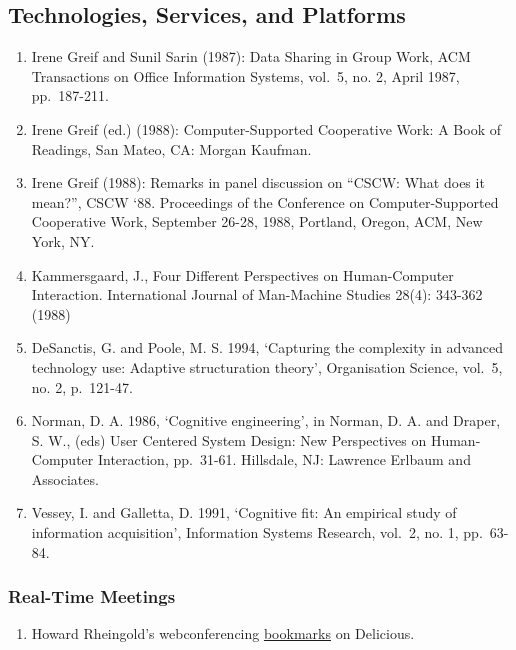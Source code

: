 \subsection{Technologies, Services, and
Platforms}\label{rec:technologies-services-and-platforms}

\begin{enumerate}
\def\labelenumi{\arabic{enumi}.}
\item
  Irene Greif and Sunil Sarin (1987): Data Sharing in Group Work, ACM
  Transactions on Office Information Systems, vol.~5, no. 2, April 1987,
  pp.~187-211.
\item
  Irene Greif (ed.) (1988): Computer-Supported Cooperative Work: A Book
  of Readings, San Mateo, CA: Morgan Kaufman.
\item
  Irene Greif (1988): Remarks in panel discussion on ``CSCW: What does
  it mean?'', CSCW `88. Proceedings of the Conference on
  Computer-Supported Cooperative Work, September 26-28, 1988, Portland,
  Oregon, ACM, New York, NY.
\item
  Kammersgaard, J., Four Different Perspectives on Human-Computer
  Interaction. International Journal of Man-Machine Studies 28(4):
  343-362 (1988)
\item
  DeSanctis, G. and Poole, M. S. 1994, `Capturing the complexity in
  advanced technology use: Adaptive structuration theory', Organisation
  Science, vol.~5, no. 2, p.~121-47.
\item
  Norman, D. A. 1986, `Cognitive engineering', in Norman, D. A. and
  Draper, S. W., (eds) User Centered System Design: New Perspectives on
  Human-Computer Interaction, pp.~31-61. Hillsdale, NJ: Lawrence Erlbaum
  and Associates.
\item
  Vessey, I. and Galletta, D. 1991, `Cognitive fit: An empirical study
  of information acquisition', Information Systems Research, vol.~2, no.
  1, pp.~63-84.
\end{enumerate}

\subsubsection{Real-Time Meetings}\label{rec:real-time-meetings}

\begin{enumerate}
\def\labelenumi{\arabic{enumi}.}
\itemsep1pt\parskip0pt
\item
  Howard Rheingold's webconferencing
  \href{http://delicious.com/hrheingold/webconferencing}{bookmarks} on
  Delicious.
\end{enumerate}

